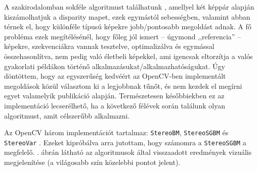 \documentclass[a4paper,oneside]{article}
\begin{document}
A szakirodalomban sokféle algoritmust találhatunk \cite{disparity-pixel} \cite{disparity-belief} \cite{disparity-dense-from-sparse}, amellyel két képpár alapján kiszámolhatjuk a disparity mapet, ezek egymástól sebességben, valamint abban térnek el, hogy különféle típusú képekre jobb/pontosabb megoldást adnak. A fő probléma ezek megítélésénél, hogy főleg jól ismert -- úgymond ,,referencia'' -- képekre, szekvenciákra vannak tesztelve, optimalizálva és egymással összehasonlítva, nem pedig való életbeli képekkel, ami igencsak eltorzítja a valós gyakorlati példákon történő alkalmazásukat/alkalmazhatóságukat. Úgy döntöttem, hogy az egyszerűség kedvéért az OpenCV-ben implementált megoldások közül választom ki a legjobbnak tűnőt, és nem kezdek el megírni egyet valamelyik publikáció alapján. Természetesen későbbiekben ez az implementáció lecserélhető, ha a következő félévek során találunk olyan algoritmust, amit célszerűbb alkalmazni.

Az OpenCV három implementációt tartalmaz: \texttt{StereoBM}, \texttt{StereoSGBM} \cite{disparity-sgbm} és \texttt{StereoVar} \cite{disparity-var}. Ezeket kipróbálva arra jutottam, hogy számomra a \texttt{StereoSGBM} a megfelelő. . ábrán látható az algoritmusok által visszaadott eredmények vizuális megjelenítése (a világosabb szín közelebbi pontot jelent).
\end{document}
